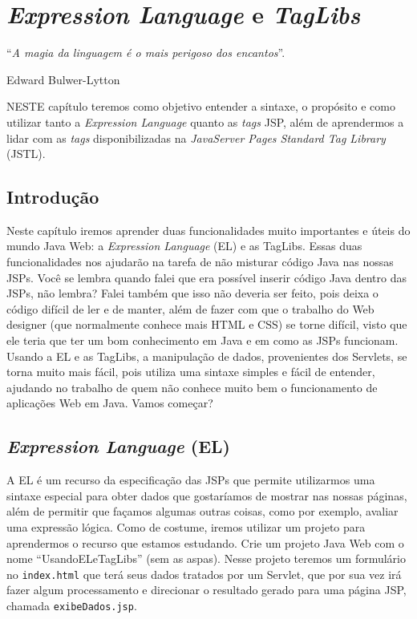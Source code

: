 \chapter{\textit{Expression Language} e \textit{TagLibs}}\label{cap:elTagLibs}
\epigraph{``\textit{A magia da linguagem é o mais perigoso dos encantos}''.}{Edward Bulwer-Lytton}

\lettrine[lines=4, lhang=0.1, lraise=0, loversize=0.2, findent=0.1em]{\textcolor{corTema}{N}}{ESTE} capítulo teremos como objetivo entender a sintaxe, o propósito e como utilizar tanto a \textit{Expression Language} quanto as \textit{tags} JSP, além de aprendermos a lidar com as \textit{tags} disponibilizadas na \textit{JavaServer Pages Standard Tag Library} (JSTL).


\section{Introdução}

Neste capítulo iremos aprender duas funcionalidades muito importantes e úteis do mundo Java Web: a \textit{Expression Language} (EL) e as TagLibs. Essas duas funcionalidades nos ajudarão na tarefa de não misturar código Java nas nossas JSPs. Você se lembra quando falei que era possível inserir código Java dentro das JSPs, não lembra? Falei também que isso não deveria ser feito, pois deixa o código difícil de ler e de manter, além de fazer com que o trabalho do Web designer (que normalmente conhece mais HTML e CSS) se torne difícil, visto que ele teria que ter um bom conhecimento em Java e em como as JSPs funcionam. Usando a EL e as TagLibs, a manipulação de dados, provenientes dos Servlets, se torna muito mais fácil, pois utiliza uma sintaxe simples e fácil de entender, ajudando no trabalho de quem não conhece muito bem o funcionamento de aplicações Web em Java. Vamos começar?


\section{\textit{Expression Language} (EL)}

A EL é um recurso da especificação das JSPs que permite utilizarmos uma sintaxe especial para obter dados que gostaríamos de mostrar nas nossas páginas, além de permitir que façamos algumas outras coisas, como por exemplo, avaliar uma expressão lógica. Como de costume, iremos utilizar um projeto para aprendermos o recurso que estamos estudando. Crie um projeto Java Web com o nome ``UsandoELeTagLibs'' (sem as aspas). Nesse projeto teremos um formulário no \texttt{index.html} que terá seus dados tratados por um Servlet, que por sua vez irá fazer algum processamento e direcionar o resultado gerado para uma página JSP, chamada \texttt{exibeDados.jsp}.

